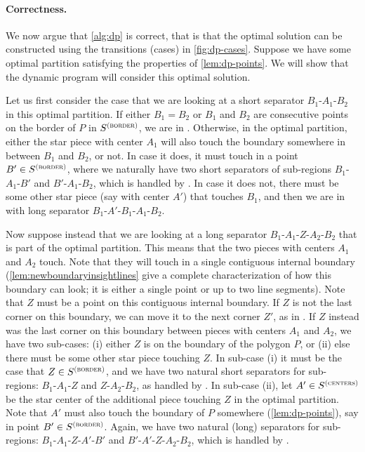 \documentclass{theoretics}
\newcommand\Scen{S^{\textsc{(centers)}}}
\newcommand\Sbor{S^{\textsc{(border)}}}
\begin{document}
\paragraph{Correctness.}
We now argue that \cref{alg:dp} is correct, that is that the optimal solution can be constructed using the transitions (cases) in \cref{fig:dp-cases}.
Suppose we have some optimal partition satisfying the properties of \cref{lem:dp-points}. We will show that the dynamic program will consider this optimal solution.

Let us first consider the case that we are looking at a short separator $B_1$-$A_1$-$B_2$ in this optimal partition. If either $B_1 = B_2$ or $B_1$ and $B_2$ are consecutive points on the border of $P$ in $\Sbor$, we are in . Otherwise, in the optimal partition, either the star piece with center $A_1$ will also touch the boundary somewhere in between $B_1$ and $B_2$, or not. In case it does, it must touch in a point $B'\in \Sbor$, where we naturally have two short separators of sub-regions $B_1$-$A_1$-$B'$ and $B'$-$A_1$-$B_2$, which is handled by . In case it does not, there must be some other star piece (say with center $A'$) that touches $B_1$, and then we are in  with long separator $B_1$-$A'$-$B_1$-$A_1$-$B_2$.

Now suppose instead that we are looking at a long separator $B_1$-$A_1$-$Z$-$A_2$-$B_2$ that is part of the optimal partition. This means that the two pieces with centers $A_1$ and $A_2$ touch. Note that they will touch in a single contiguous internal boundary (\cref{lem:newboundaryinsightlines} give a complete characterization of how this boundary can look; it is either a single point or up to two line segments). Note that $Z$ must be a point on this contiguous internal boundary. If $Z$ is not the last corner on this boundary, we can move it to the next corner $Z'$, as in . If $Z$ instead was the last corner on this boundary between pieces with centers $A_1$ and $A_2$, we have two sub-cases: (i) either $Z$ is on the boundary of the polygon $P$, or (ii) else there must be some other star piece touching $Z$. In sub-case (i) it must be the case that $Z\in \Sbor$, and we have two natural short separators for sub-regions: $B_1$-$A_1$-$Z$ and $Z$-$A_2$-$B_2$, as handled by . In sub-case (ii), let $A'\in \Scen$ be the star center of the additional piece touching $Z$ in the optimal partition. Note that $A'$ must also touch the boundary of $P$ somewhere (\cref{lem:dp-points}), say in point $B'\in \Sbor$. Again, we have two natural (long) separators for sub-regions: $B_1$-$A_1$-$Z$-$A'$-$B'$ and $B'$-$A'$-$Z$-$A_2$-$B_2$, which is handled by .
\end{document}
